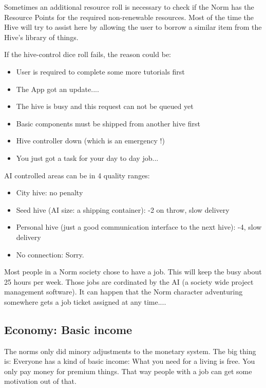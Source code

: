 Sometimes an additional resource roll is necessary to check if the Norm has the Resource Points for the required non-renewable resources. Most of the time the Hive will try to assist here by allowing the user to borrow a similar item from the Hive's library of things.

If the hive-control dice roll fails, the reason could be:
\begin{itemize}
    \item User is required to complete some more tutorials first
    \item The App got an update....
    \item The hive is busy and this request can not be queued yet
    \item Basic components must be shipped from another hive first
    \item Hive controller down (which is an emergency !)
    \item You just got a task for your day to day job...
\end{itemize}

AI controlled areas can be in 4 quality ranges:

\begin{itemize}
    \item City hive: no penalty
    \item Seed hive (AI size: a shipping container): -2 on throw, slow delivery
    \item Personal hive (just a good communication interface to the next hive): -4, slow delivery
    \item No connection: Sorry.
\end{itemize}

Most people in a Norm society chose to have a job. This will keep the busy about 25 hours per week. Those jobs are cordinated by the AI (a society wide project management software). It can happen that the Norm character adventuring somewhere gets a job ticket assigned at any time....

\subsection{Economy: Basic income}
\label{sec:basic income}

The norms only did minory adjustments to the monetary system. The big thing is: Everyone has a kind of basic income: What you need for a living is free.
You only pay money for premium things. That way people with a job can get some motivation out of that.

